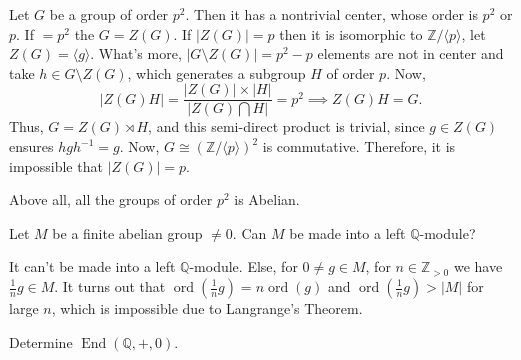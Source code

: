 \begin{solution}
    Let $G$ be a group of order $p^{2}$. Then it has a nontrivial center, whose order is $p^{2}$ or $p$. 
    If $=p^{2}$ the $G=Z(G)$. 
    If $|Z(G)|=p$ then it is isomorphic to $\mathbb{Z}/\langle p \rangle $, let $Z(G)=\langle g \rangle$. 
    What's more, $|G\setminus Z(G)|=p^{2}-p$ elements are not in center and take $h\in G\setminus Z(G)$, which generates a subgroup $H$ of order $p$. 
    Now, 
        \[
            |Z(G) H|=\frac{|Z(G)|\times|H|}{|Z(G)\bigcap H|}=p^{2}\implies Z(G)H=G.
        \]
    Thus, $G=Z(G)\rtimes H$, and this semi-direct product is trivial, since $g\in Z(G)$ ensures $h g h^{-1}=g$. 
    Now, $G\cong (\mathbb{Z}/\langle p \rangle)^{2} $ is commutative. Therefore, it is impossible that $|Z(G)|=p$.
    \par Above all, all the groups of order $p^{2}$ is Abelian.
\end{solution}
\setcounter{pb}{8}
\begin{problem}
    Let $M $ be a finite abelian group $\neq 0$. Can $M $ be made into a left $\mathbb{Q}$-module?
\end{problem}

\begin{solution}
    It can't be made into a left $\mathbb{Q}$-module. Else, for $0\neq g\in M$, for $n\in\mathbb{Z}_{>0}$ we have $\frac{1}{n}g\in M$. 
    It turns out that $\operatorname{ord}(\frac{1}{n}g)=n \operatorname{ord}(g)$ and $\operatorname{ord}(\frac{1}{n}g)>|M|$ for large $n$, 
    which is impossible due to Langrange's Theorem.
\end{solution}

    
\setcounter{pb}{10}
\begin{problem}
    Determine $\operatorname{End}(\mathbb{Q},+,0)$.
\end{problem}


